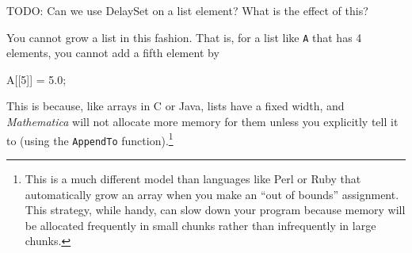 TODO: Can we use DelaySet on a list element? What is the effect of this?

You cannot grow a list in this fashion. That is, for a list like \texttt{A} that has 4 elements, you cannot add a fifth element by 
\begin{code}
	   A[[5]] = 5.0;
\end{code}
This is because, like arrays in C or Java, lists have a fixed width, and \emph{Mathematica} will not allocate more memory for them unless you explicitly tell it to (using the \texttt{AppendTo} function).\footnote{This is a much different model than languages like Perl or Ruby that automatically grow an array when you make an ``out of bounds'' assignment. This strategy, while handy, can slow down your program because memory will be allocated frequently in small chunks rather than infrequently in large chunks.}
